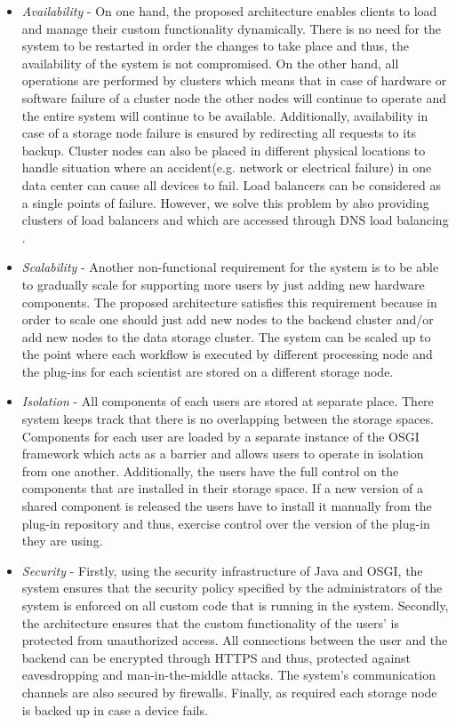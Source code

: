 \begin{itemize}

\item \textit{Availability} - On one hand, the proposed architecture enables clients to load and manage their custom functionality dynamically. There is no need for the system to be restarted in order the changes to take place and thus, the availability of the system is not compromised. 
On the other hand, all operations are performed by clusters which means that in case of hardware or software failure of a cluster node the other nodes will continue to operate and the entire system will continue to be available. Additionally, availability in case of a storage node failure is ensured by redirecting all requests to its backup. Cluster nodes can also be placed in different physical locations to handle situation where an accident(e.g. network or electrical failure) in one data center can cause all devices to fail. Load balancers can be considered as a single points of failure. However, we solve this problem by also providing clusters of load balancers and which are accessed through DNS load balancing \cite{Membrey}.

\item \textit{Scalability} - Another non-functional requirement for the system is to be able to gradually scale for supporting more users  by just adding new hardware components. The proposed architecture satisfies this requirement because in order to scale one should just add new nodes to the backend cluster and/or add new nodes to the data storage cluster. The system can be scaled up to the point where each workflow is executed by different processing node and the plug-ins for each scientist are stored on a different storage node.

\item \textit{Isolation} - All components of each users are stored at separate place. There system keeps track that there is no overlapping between the storage spaces. Components for each user are loaded by a separate instance of the OSGI framework which acts as a barrier and allows users to operate in isolation from one another. Additionally, the users have the full control on the components that are installed in their storage space. If a new version of a shared component is released the users have to install it manually from the plug-in repository and thus, exercise control over the version of the plug-in they are using. 


\item \textit{Security} - Firstly, using the security infrastructure of Java and OSGI, the system ensures that the security policy specified by the administrators of the system is enforced on all custom code that is running in the system. Secondly, the architecture ensures that the custom functionality of the users' is protected from unauthorized access. All connections between the user and the backend can be encrypted through HTTPS and thus, protected against eavesdropping and man-in-the-middle attacks. The system's communication channels are also secured by firewalls. Finally, as required each storage node is backed up in case a device fails.


\end{itemize}
